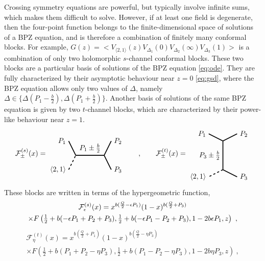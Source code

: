 \documentclass[12pt, a4paper]{article}
\theoremstyle{break}
\begin{document}
Crossing symmetry equations are powerful, but typically involve infinite sums, which makes them difficult to solve.
However, if at least one field is degenerate, then the four-point function belongs to the finite-dimensional space of solutions of a BPZ equation, and is therefore a combination of finitely many conformal blocks. 
For example,
$G(z)=\Big< V_{\langle 2, 1 \rangle}(z) V_{\Delta_1}(0)V_{\Delta_2}(\infty)V_{\Delta_3}(1) \Big>$ is a combination of only two holomorphic $s$-channel conformal blocks.
These two blocks are a particular basis of solutions of the BPZ equation \eqref{eq:ode}.
They are fully characterized by their asymptotic behaviour near $z=0$ \eqref{eq:gsd}, where the BPZ equation allows only two values of $\Delta$, namely $\Delta\in\{\Delta(P_1-\frac{b}{2}),\Delta(P_1+\frac{b}{2})\}$.
Another basis of solutions of the same BPZ equation is given by two $t$-channel blocks, which are characterized by their power-like behaviour near $z=1$.
\begin{align}
 \mathcal{F}^{(s)}_\pm(x)  =  
 \begin{tikzpicture}[baseline=(current  bounding  box.center), very thick, scale = .35]
\draw (-1,2) node [left] {$P_1$} -- (0,0) -- node [above] {$P_1\pm \frac{b}{2}$} (4,0) -- (5,2) node [right] {$P_2$};
\draw[dashed] (-1,-2) node [left] {$\langle 2,1 \rangle$} -- (0,0);
\draw (4,0) -- (5,-2) node [right] {$P_3$};
\end{tikzpicture}
\qquad , \qquad 
\mathcal{F}^{(t)}_\pm(x)  =  
 \begin{tikzpicture}[baseline=(current  bounding  box.center), very thick, scale = .35]
 \draw (-2,3) node [left] {$P_1$} -- (0,2) -- node [left] {$P_3\pm \frac{b}{2}$} (0,-2);
 \draw[dashed] (0, -2) -- (-2, -3) node [left] {$\langle 2,1 \rangle$};
\draw (0,2) -- (2,3) node [right] {$P_2$};
\draw (0,-2) -- (2, -3) node [right] {$P_3$};
\end{tikzpicture}
\label{gpic}
\end{align}
These blocks are written in terms of the hypergeometric function,
\begin{multline}
\renewcommand{\arraystretch}{1.3}
 \mathcal{F}^{(s)}_\epsilon(x) = x^{b(\frac{Q}{2}-\epsilon P_1)} (1-x)^{b(\frac{Q}{2}+P_3)} 
 \\
 \times F\left(\tfrac12 + b(-\epsilon P_1+P_2+P_3), \tfrac12 + b(-\epsilon P_1-P_2+P_3), 1 - 2b\epsilon P_1, z\right)\ ,
\label{gpm}
\end{multline}
\begin{multline}
 \mathcal{F}^{(t)}_\eta(x) = x^{b(\frac{Q}{2}+P_1)} (1-x)^{b(\frac{Q}{2}-\eta P_3)}
 \\
 \times F\left(\tfrac12 + b(P_1+P_2-\eta P_3), \tfrac12 + b(P_1-P_2-\eta P_3), 1 - 2b\eta P_3, z\right)\ ,
 \label{tpm}
\end{multline}
\end{document}

